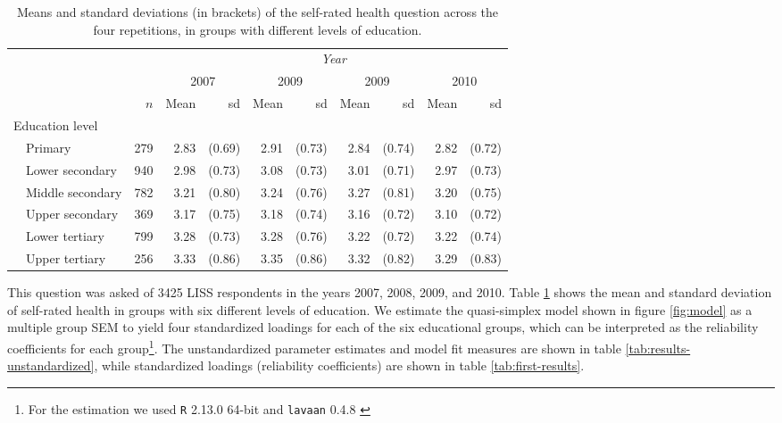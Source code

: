 \documentclass[a4paper,11pt]{article}
\newcommand{\0}{\boldsymbol{0}}
\newcommand{\R}{\texttt{R} 2.13.0 64-bit \citep{R}\;}
\newcommand{\lavaan}{\texttt{lavaan} 0.4.8 \citep{lavaan}\;}
\begin{document}
\begin{table}[bt]\begin{small}
\begin{center}
\begin{tabular}{llrrrrrrrrr}  \hline  \hline
&&&  \multicolumn{8}{c}{\emph{Year}}\\\cline{4-11}
&&& \multicolumn{2}{c}{2007} & \multicolumn{2}{c}{2009} & \multicolumn{2}{c}{2009} & \multicolumn{2}{c}{2010} \\
&&$n$&Mean&sd&Mean&sd&Mean&sd&Mean&sd\\
  \hline
  \multicolumn{2}{l}{Education level}\\
 
& Primary	  & 279 & 2.83 & (0.69) & 2.91 & (0.73) & 2.84 & (0.74) & 2.82 & (0.72) \\ 
& Lower secondary  & 940 & 2.98 & (0.73) & 3.08 & (0.73) & 3.01 & (0.71) & 2.97 & (0.73) \\ 
& Middle secondary & 782 & 3.21 & (0.80) & 3.24 & (0.76) & 3.27 & (0.81) & 3.20 & (0.75) \\ 
& Upper secondary  & 369 & 3.17 & (0.75) & 3.18 & (0.74) & 3.16 & (0.72) & 3.10 & (0.72) \\ 
& Lower tertiary	  & 799 & 3.28 & (0.73) & 3.28 & (0.76) & 3.22 & (0.72) & 3.22 & (0.74) \\ 
& Upper tertiary	  & 256 & 3.33 & (0.86) & 3.35 & (0.86) & 3.32 & (0.82) & 3.29 & (0.83) \\ 
   \hline
   \hline
\end{tabular}
\caption{Means and standard deviations (in brackets) of the self-rated health question across the four repetitions, in 
groups with different levels of education.}\label{tab:descriptives}
\end{center}\end{small}
\end{table}

This question was asked of 3425 LISS respondents in the years 2007, 2008, 2009, and 2010. 
Table \ref{tab:descriptives} shows the mean and standard deviation of self-rated health in
groups with six different levels of education.
We estimate the quasi-simplex model shown in figure \ref{fig:model} as a multiple group SEM
to yield four standardized loadings for each of the six educational groups, which can be interpreted as the reliability coefficients for each group\footnote{For the estimation we used \R and \lavaan}. The unstandardized parameter estimates and model fit measures are shown in table \ref{tab:results-unstandardized}, while standardized loadings (reliability coefficients) are shown in table \ref{tab:first-results}.
\end{document}
